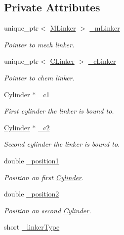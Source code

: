\subsection*{Private Attributes}
\begin{DoxyCompactItemize}
\item 
unique\+\_\+ptr$<$ \hyperlink{classMLinker}{M\+Linker} $>$ \hyperlink{classLinker_a0b17c705cb1e5f89777f2675bd857e1c}{\+\_\+m\+Linker}
\begin{DoxyCompactList}\small\item\em Pointer to mech linker. \end{DoxyCompactList}\item 
unique\+\_\+ptr$<$ \hyperlink{classCLinker}{C\+Linker} $>$ \hyperlink{classLinker_a6cbe666ab89dd1b4ed0eae03d8f25d63}{\+\_\+c\+Linker}
\begin{DoxyCompactList}\small\item\em Pointer to chem linker. \end{DoxyCompactList}\item 
\hyperlink{classCylinder}{Cylinder} $\ast$ \hyperlink{classLinker_ae73f608f5ffd4098f7191de6ba504680}{\+\_\+c1}
\begin{DoxyCompactList}\small\item\em First cylinder the linker is bound to. \end{DoxyCompactList}\item 
\hyperlink{classCylinder}{Cylinder} $\ast$ \hyperlink{classLinker_a60b5cefe855173c410cb4471cd85d14f}{\+\_\+c2}
\begin{DoxyCompactList}\small\item\em Second cylinder the linker is bound to. \end{DoxyCompactList}\item 
double \hyperlink{classLinker_ad16ab7afce0a3a09b455f3407a382bf2}{\+\_\+position1}
\begin{DoxyCompactList}\small\item\em Position on first \hyperlink{classCylinder}{Cylinder}. \end{DoxyCompactList}\item 
double \hyperlink{classLinker_a1efe8ae37a4b70b843c0d7f2dfa47b90}{\+\_\+position2}
\begin{DoxyCompactList}\small\item\em Position on second \hyperlink{classCylinder}{Cylinder}. \end{DoxyCompactList}\item 
short \hyperlink{classLinker_a82213082aecfbbb0e69be04ae9357b68}{\+\_\+linker\+Type}

\end{DoxyCompactItemize}
